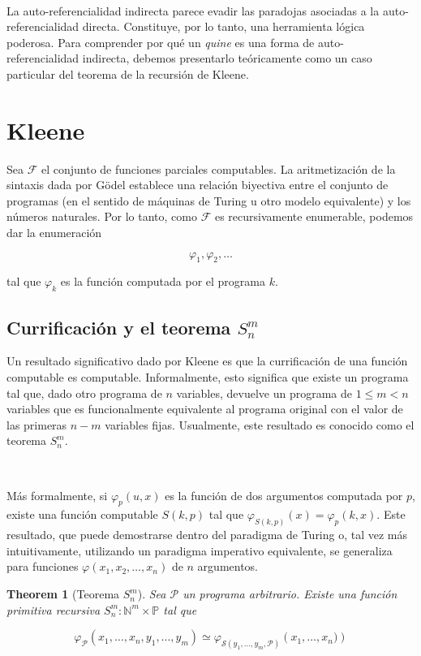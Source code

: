 \documentclass[a4paper, 12pt]{article}
\newtheorem{theorem}{Theorem}
\newtheorem{theorem}{Theorem}
\begin{document}
~ 

La auto-referencialidad indirecta parece evadir las paradojas asociadas a la
auto-referencialidad directa. Constituye, por lo tanto, una herramienta lógica
poderosa. Para comprender por qué un \textit{quine} es una forma de
auto-referencialidad indirecta, debemos presentarlo teóricamente como un caso
particular del teorema de la recursión de Kleene.

\section{Kleene}

Sea $\mathcal{F}$ el conjunto de funciones parciales computables. La
aritmetización de la sintaxis dada por Gödel establece una relación biyectiva
entre el conjunto de programas (en el sentido de máquinas de Turing u otro modelo equivalente)
y los números naturales. Por lo tanto, como $\mathcal{F}$ es recursivamente
enumerable, podemos dar la enumeración 

\begin{equation*}
  \varphi_1, \varphi_2, \ldots
\end{equation*}

tal que $\varphi_k$ es la función computada por el programa $k$. 

\subsection{Currificación y el teorema $S_n^m$}

Un resultado significativo dado por Kleene es que la currificación de una
función computable es computable. Informalmente, esto significa que existe un
programa tal que, dado otro programa de $n$ variables, devuelve un programa de $1
\leq m < n$ variables que es funcionalmente equivalente al programa original
con el valor de las primeras $n - m$ variables fijas. Usualmente, este resultado
es conocido como el teorema $S_n^m$.

~

Más formalmente, si $\varphi_p(u, x)$ es la función de dos
argumentos computada por $p$, existe una función computable $S(k, p)$ tal que
$\varphi_{S(k, p)}(x) = \varphi_p(k, x)$. Este resultado, que puede demostrarse
dentro del paradigma de Turing o, tal vez más intuitivamente, utilizando un
paradigma imperativo equivalente, se generaliza para funciones $\varphi(x_1, x_2,
\ldots, x_n)$ de $n$ argumentos. 

\begin{theorem}[Teorema $S_n^m$]
  Sea $\mathcal{P}$ un programa arbitrario. Existe una función primitiva
  recursiva $S_n^m : \mathbb{N}^m \times \mathbb{P}$ tal que 

  \begin{equation*}
    \varphi_\mathcal{P}(x_1, \ldots, x_n, y_1, \ldots, y_m) \simeq
    \varphi_{\mathcal{S}(y_1,\ldots, y_m, \mathcal{P})} \left(
    x_1, \ldots, x_n) \right) 
  \end{equation*}

\end{theorem}
\end{document}
